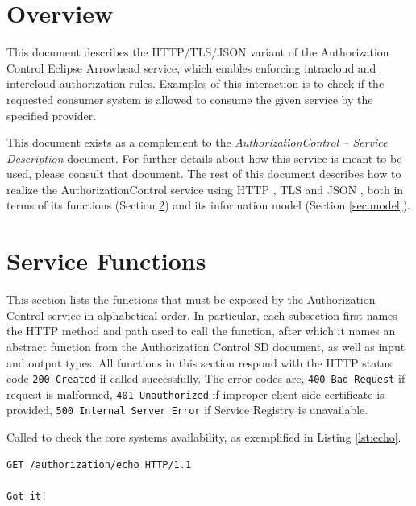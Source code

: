 \documentclass[a4paper]{arrowhead}
\newcommand{\fref}[1]{{\textcolor{ArrowheadBlue}{\hyperref[sec:functions:#1]{#1}}}}
\begin{document}
\section{Overview}
\label{sec:overview}

This document describes the HTTP/TLS/JSON variant of the Authorization Control Eclipse Arrowhead service, which enables enforcing intracloud and intercloud authorization rules.
Examples of this interaction is to check if the requested consumer system is allowed to consume the given service by the specified provider. 

This document exists as a complement to the \textit{AuthorizationControl -- Service Description} document.
For further details about how this service is meant to be used, please consult that document.
The rest of this document describes how to realize the AuthorizationControl service using HTTP \cite{fielding2014hypertext}, TLS \cite{rescorla2018transport} and JSON \cite{bray2014json}, both in terms of its functions (Section \ref{sec:functions}) and its information model (Section \ref{sec:model}).

\newpage

\section{Service Functions}
\label{sec:functions}

This section lists the functions that must be exposed by the Authorization Control service in alphabetical order.
In particular, each subsection first names the HTTP method and path used to call the function, after which it names an abstract function from the Authorization Control SD document, as well as input and output types.
All functions in this section respond with the HTTP status code \texttt{200 Created} if called successfully. The error codes are, \texttt{400 Bad Request} if request is malformed, \texttt{401 Unauthorized} if improper client side certificate is provided, \texttt{500 Internal Server Error} if Service Registry is unavailable.


Called to check the core systems availability, as exemplified in Listing \ref{lst:echo}.

\begin{lstlisting}[language=http,label={lst:echo},caption={An \fref{Echo} invocation response.}]
GET /authorization/echo HTTP/1.1

Got it!
\end{lstlisting}
\end{document}
